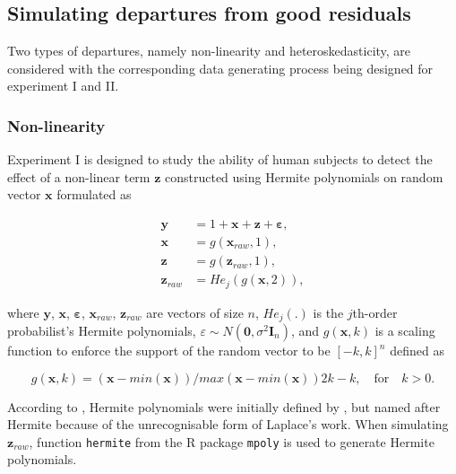 \documentclass[]{interact}
\theoremstyle{plain}%
\theoremstyle{definition}
\theoremstyle{remark}
\begin{document}
\hypertarget{simulating-departures-from-good-residuals}{%
\subsection{Simulating departures from good
residuals}\label{simulating-departures-from-good-residuals}}

Two types of departures, namely non-linearity and heteroskedasticity,
are considered with the corresponding data generating process being
designed for experiment I and II.

\hypertarget{non-linearity}{%
\subsubsection{Non-linearity}\label{non-linearity}}

Experiment I is designed to study the ability of human subjects to
detect the effect of a non-linear term \(\boldsymbol{z}\) constructed
using Hermite polynomials on random vector \(\boldsymbol{x}\) formulated
as

\begin{align} \label{eq:nonlinearity-model}
\boldsymbol{y} &= 1 + \boldsymbol{x} + \boldsymbol{z} + \boldsymbol{\varepsilon},\\
\boldsymbol{x} &= g(\boldsymbol{x}_{raw}, 1), \\
\boldsymbol{z} &= g(\boldsymbol{z}_{raw}, 1), \\
\boldsymbol{z}_{raw} &= He_j(g(\boldsymbol{x}, 2)),
\end{align}

\noindent where \(\boldsymbol{y}\), \(\boldsymbol{x}\),
\(\boldsymbol{\varepsilon}\), \(\boldsymbol{x}_{raw}\),
\(\boldsymbol{z}_{raw}\) are vectors of size \(n\), \(He_{j}(.)\) is the
\(j\)th-order probabilist's Hermite polynomials,
\(\varepsilon \sim N(\boldsymbol{0}, \sigma^2\boldsymbol{I}_n)\), and
\(g(\boldsymbol{x}, k)\) is a scaling function to enforce the support of
the random vector to be \([-k, k]^n\) defined as

\begin{equation} \label{eq:scaling-function}
g(\boldsymbol{x}, k) = (\boldsymbol{x} - min(\boldsymbol{x}))/max(\boldsymbol{x} - min(\boldsymbol{x}))2k - k, \quad \text{for} \quad k > 0. 
\end{equation}

According to \citet{abramowitz1964handbook}, Hermite polynomials were
initially defined by \citet{de1820theorie}, but named after Hermite
\citep{hermite1864nouveau} because of the unrecognisable form of
Laplace's work. When simulating \(\boldsymbol{z}_{raw}\), function
\texttt{hermite} from the R package \texttt{mpoly} \citep{mpoly} is used
to generate Hermite polynomials.
\end{document}
